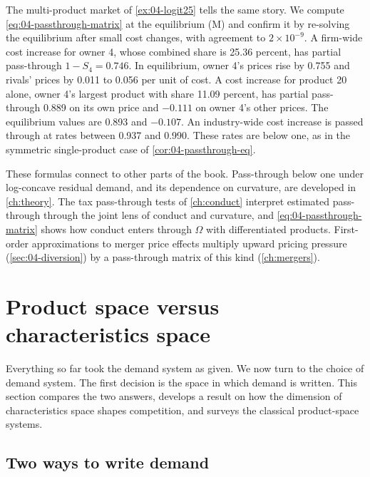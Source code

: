 The multi-product market of \cref{ex:04-logit25} tells the same story. We compute
\eqref{eq:04-passthrough-matrix} at the equilibrium (M) and confirm it by re-solving the equilibrium after small
cost changes, with agreement to $2 \times 10^{-9}$. A firm-wide cost increase for owner 4, whose combined share
is 25.36 percent, has partial pass-through $1 - S_4 = 0.746$. In equilibrium, owner 4's prices rise by 0.755
and rivals' prices by 0.011 to 0.056 per unit of cost. A cost increase for product 20 alone, owner 4's largest
product with share 11.09 percent, has partial pass-through 0.889 on its own price and $-0.111$ on owner 4's other
prices. The equilibrium values are 0.893 and $-0.107$. An industry-wide cost increase is passed through at rates
between 0.937 and 0.990. These rates are below one, as in the symmetric single-product case of
\cref{cor:04-passthrough-eq}.

These formulas connect to other parts of the book. Pass-through below one under log-concave residual demand, and
its dependence on curvature, are developed in \cref{ch:theory}. The tax pass-through tests of \cref{ch:conduct}
interpret estimated pass-through through the joint lens of conduct and curvature, and \eqref{eq:04-passthrough-matrix}
shows how conduct enters through $\Omega$ with differentiated products. First-order approximations to merger
price effects multiply upward pricing pressure (\cref{sec:04-diversion}) by a pass-through matrix of this kind
(\cref{ch:mergers}).

\section{Product space versus characteristics space}\label{sec:04-spaces}

Everything so far took the demand system as given. We now turn to the choice of demand system. The first
decision is the space in which demand is written. This section compares the two answers, develops a result on
how the dimension of characteristics space shapes competition, and surveys the classical product-space systems.

\subsection{Two ways to write demand}\label{sec:04-spaces-def}

